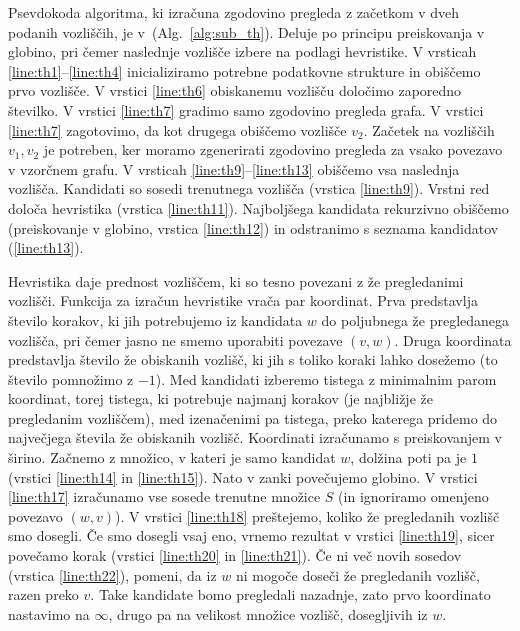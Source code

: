 \documentclass[a4paper, 12pt, ]{book}
\newcommand{\refalg}[1]{(Alg.~\ref{#1})}
\begin{document}
	Psevdokoda algoritma, ki izračuna zgodovino pregleda z začetkom v dveh podanih vozliščih, je v~\refalg{alg:sub_th}. Deluje po principu preiskovanja
	v globino, pri čemer naslednje vozlišče izbere na podlagi hevristike. V vrsticah \ref{line:th1}--\ref{line:th4} inicializiramo potrebne podatkovne strukture
	in obiščemo prvo vozlišče. V vrstici \ref{line:th6} obiskanemu vozlišču določimo zaporedno številko. V vrstici \ref{line:th7} gradimo samo zgodovino
	pregleda grafa. V vrstici \ref{line:th7} zagotovimo, da kot drugega obiščemo vozlišče $v_2$. Začetek na vozliščih $v_1, v_2$ je potreben, ker moramo 
	zgenerirati zgodovino pregleda za vsako povezavo v vzorčnem grafu. V vrsticah \ref{line:th9}--\ref{line:th13} obiščemo vsa naslednja vozlišča. Kandidati
	so sosedi trenutnega vozlišča (vrstica \ref{line:th9}). Vrstni red določa hevristika (vrstica \ref{line:th11}). Najboljšega kandidata rekurzivno obiščemo
	(preiskovanje v globino, vrstica \ref{line:th12}) in odstranimo s seznama kandidatov (\ref{line:th13}).
	
	Hevristika daje prednost vozliščem, ki so tesno povezani z že pregledanimi vozlišči. Funkcija za izračun hevristike vrača par koordinat. Prva predstavlja
	število korakov, ki jih potrebujemo iz kandidata $w$ do poljubnega že pregledanega vozlišča, pri čemer jasno ne smemo uporabiti povezave $(v, w)$.
	Druga koordinata predstavlja število že obiskanih vozlišč, ki jih s toliko koraki lahko dosežemo (to število pomnožimo z $-1$). Med kandidati izberemo
	tistega z minimalnim parom koordinat, torej tistega, ki potrebuje najmanj korakov (je najbližje že pregledanim vozliščem), med izenačenimi pa tistega,
	preko katerega pridemo do največjega števila že obiskanih vozlišč.
	Koordinati izračunamo s preiskovanjem v širino. Začnemo z množico, v kateri je samo kandidat $w$, dolžina poti pa je $1$ (vrstici \ref{line:th14} in
	\ref{line:th15}). Nato v zanki povečujemo globino. V vrstici \ref{line:th17} izračunamo vse sosede trenutne množice $S$ (in ignoriramo omenjeno
	povezavo $(w,v)$). V vrstici \ref{line:th18} preštejemo, koliko že pregledanih vozlišč smo dosegli. Če smo dosegli vsaj eno, vrnemo rezultat
	v vrstici \ref{line:th19}, sicer povečamo korak (vrstici \ref{line:th20} in \ref{line:th21}). Če ni več novih sosedov (vrstica \ref{line:th22}), pomeni,
	da iz $w$ ni mogoče doseči že pregledanih vozlišč, razen preko $v$. Take kandidate bomo pregledali nazadnje, zato prvo koordinato nastavimo na 
	$\infty$, drugo pa na velikost množice vozlišč, dosegljivih iz $w$.
	
\end{document}
